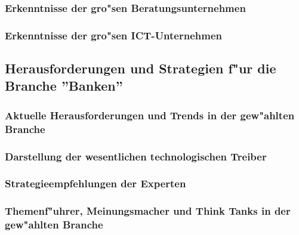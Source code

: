\documentclass[a4paper, 12pt]{article} %
\begin{document}
\subsubsection{Erkenntnisse der gro"sen Beratungsunternehmen}


\subsubsection{Erkenntnisse der gro"sen ICT-Unternehmen}



\subsection{Herausforderungen und Strategien f"ur die Branche ''Banken''}

\subsubsection{Aktuelle Herausforderungen und Trends in der gew"ahlten Branche}


\subsubsection{Darstellung der wesentlichen technologischen Treiber}


\subsubsection{Strategieempfehlungen der Experten}


\subsubsection{Themenf"uhrer, Meinungsmacher und Think Tanks in der gew"ahlten Branche}


\end{document}
